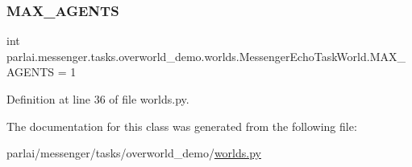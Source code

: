 \subsubsection{\texorpdfstring{M\+A\+X\+\_\+\+A\+G\+E\+N\+TS}{MAX\_AGENTS}}
{\footnotesize\ttfamily int parlai.\+messenger.\+tasks.\+overworld\+\_\+demo.\+worlds.\+Messenger\+Echo\+Task\+World.\+M\+A\+X\+\_\+\+A\+G\+E\+N\+TS = 1\hspace{0.3cm}{\ttfamily [static]}}



Definition at line 36 of file worlds.\+py.



The documentation for this class was generated from the following file\+:\begin{DoxyCompactItemize}
\item 
parlai/messenger/tasks/overworld\+\_\+demo/\hyperlink{parlai_2messenger_2tasks_2overworld__demo_2worlds_8py}{worlds.\+py}\end{DoxyCompactItemize}
